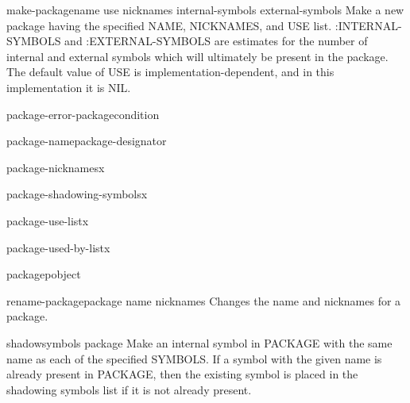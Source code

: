 \begin{function}{make-package}{name \key use nicknames internal-symbols external-symbols}{}{}
  Make a new package having the specified NAME, NICKNAMES, and USE
list. :INTERNAL-SYMBOLS and :EXTERNAL-SYMBOLS are estimates for the number of
internal and external symbols which will ultimately be present in the package.
The default value of USE is implementation-dependent, and in this
implementation it is NIL.
\end{function}

\begin{function}{package-error-package}{condition}{}{}
  
\end{function}

\begin{function}{package-name}{package-designator}{}{}
  
\end{function}

\begin{function}{package-nicknames}{x}{}{}
  
\end{function}

\begin{function}{package-shadowing-symbols}{x}{}{}
  
\end{function}

\begin{function}{package-use-list}{x}{}{}
  
\end{function}

\begin{function}{package-used-by-list}{x}{}{}
  
\end{function}

\begin{function}{packagep}{object}{}{}
  
\end{function}

\begin{function}{rename-package}{package name \op nicknames}{}{}
  Changes the name and nicknames for a package.
\end{function}

\begin{function}{shadow}{symbols \op package}{}{}
  Make an internal symbol in PACKAGE with the same name as each of the
specified SYMBOLS. If a symbol with the given name is already present in
PACKAGE, then the existing symbol is placed in the shadowing symbols list if
it is not already present.
\end{function}

